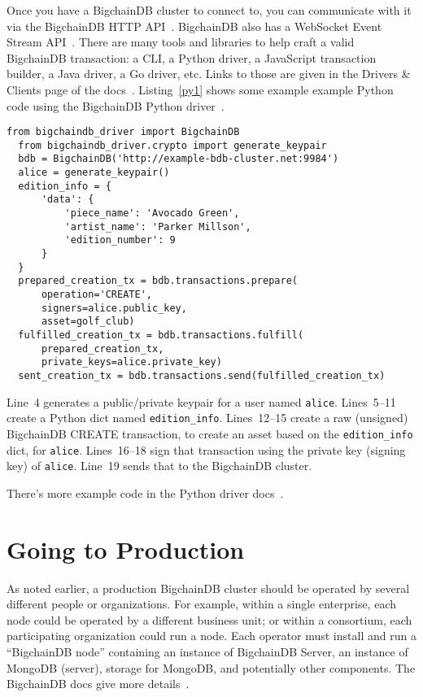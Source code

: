 \documentclass[a4paper]{article}
\begin{document}
Once you have a BigchainDB cluster to connect to,
you can communicate with it via the BigchainDB HTTP API~\cite{bigchaindb_http_api}.
BigchainDB also has a WebSocket Event Stream API~\cite{bigchaindb_websocket_api}.
There are many tools and libraries to help craft a valid BigchainDB transaction:
a CLI, a Python driver, a JavaScript transaction builder, a Java driver, a Go driver, etc.
Links to those are given in the Drivers \& Clients page of the docs~\cite{bigchaindb_drivers_clients}.
Listing~\ref{py1} shows some example example Python code
using the BigchainDB Python driver~\cite{bigchaindb_python_driver}.


\begin{minipage}{\linewidth}
  \begin{lstlisting}[caption={Example Code Using the Python Driver}, label={py1}, style=python]
  from bigchaindb_driver import BigchainDB
  from bigchaindb_driver.crypto import generate_keypair
  bdb = BigchainDB('http://example-bdb-cluster.net:9984')
  alice = generate_keypair()
  edition_info = {
      'data': {
          'piece_name': 'Avocado Green',
          'artist_name': 'Parker Millson',
          'edition_number': 9
      }
  }
  prepared_creation_tx = bdb.transactions.prepare(
      operation='CREATE',
      signers=alice.public_key,
      asset=golf_club)
  fulfilled_creation_tx = bdb.transactions.fulfill(
      prepared_creation_tx,
      private_keys=alice.private_key)
  sent_creation_tx = bdb.transactions.send(fulfilled_creation_tx)\end{lstlisting}
\end{minipage}

\medskip

Line~4 generates a public/private keypair for a user named \texttt{alice}.
Lines~5--11 create a Python dict named \texttt{edition\_info}.
Lines~12--15 create a raw (unsigned) BigchainDB CREATE transaction,
to create an asset based on the \texttt{edition\_info} dict, for \texttt{alice}.
Lines~16--18 sign that transaction using the private key (signing key)
of \texttt{alice}. Line~19 sends that to the BigchainDB cluster.

There's more example code
in the Python driver docs~\cite{bigchaindb_python_driver}.


\section{Going to Production}

As noted earlier, a production BigchainDB cluster should be operated
by several different people or organizations.
For example, within a single enterprise,
each node could be operated by a different business unit;
or within a consortium, each participating organization could run a node.
Each operator must install and run a ``BigchainDB node''
containing an instance of BigchainDB Server,
an instance of MongoDB (server),
storage for MongoDB,
and potentially other components.
The BigchainDB docs give more details~\cite{bigchaindb_prod_nodes}.
\end{document}
